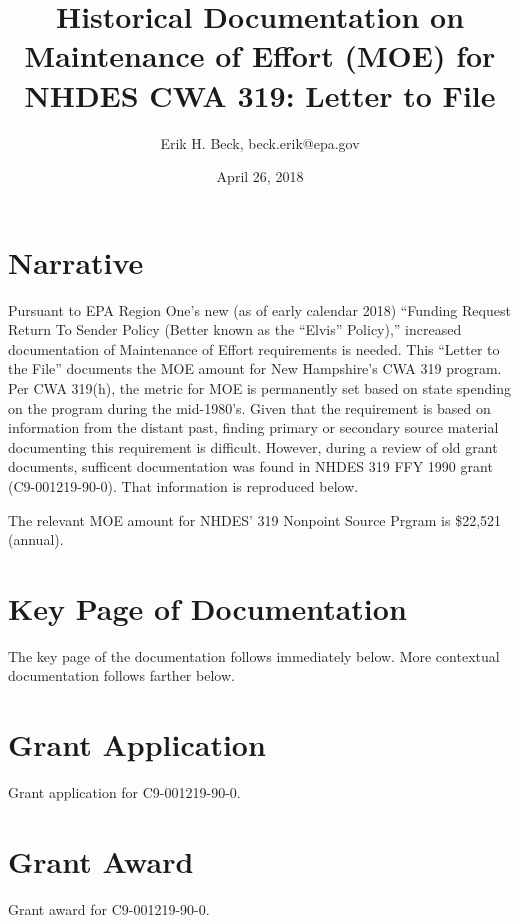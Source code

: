\documentclass{article}
\begin{document}
\date{April 26, 2018}

\author{Erik H. Beck, beck.erik@epa.gov}

\title{Historical Documentation on Maintenance of Effort (MOE) for
  NHDES CWA 319: Letter to File}

\maketitle

\section{Narrative}
Pursuant to EPA Region One's new (as of early calendar 2018) ``Funding
Request Return To Sender Policy (Better known as the ``Elvis''
Policy),'' increased documentation of Maintenance of Effort
requirements is needed. This ``Letter to the File'' documents the MOE
amount for New Hampshire's CWA 319 program.  Per CWA 319(h), the
metric for MOE is permanently set based on state spending on the
program during the mid-1980's. Given that the requirement is based on
information from the distant past, finding primary or secondary source
material documenting this requirement is difficult.  However,  during
a review of old grant documents, sufficent documentation was found in
NHDES 319 FFY 1990 grant (C9-001219-90-0). That information is
reproduced below.

The relevant MOE amount for NHDES' 319 Nonpoint Source Prgram is
\$22,521 (annual).

\section{Key Page of Documentation}
The key page of the documentation follows immediately below.  More
contextual documentation follows farther below.


\section{Grant Application}
Grant application for C9-001219-90-0.


\section{Grant Award}
Grant award for C9-001219-90-0.

\end{document}
